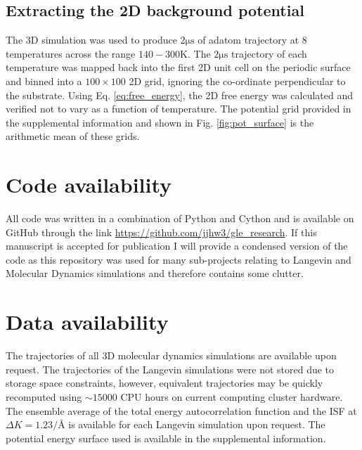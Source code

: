 \documentclass[7pt]{article}
\newcommand{\us}{\si{\micro\second}}
\newcommand{\K}{\si{\kelvin}}
\begin{document}
\subsection*{Extracting the 2D background potential}

The 3D simulation was used to produce $2\us$ of adatom trajectory at 8 temperatures across the range $140-300\K$. The $2\us$ trajectory of each temperature was mapped back into the first 2D unit cell on the periodic surface and binned into a $100\times100$ 2D grid, ignoring the co-ordinate perpendicular to the substrate. Using Eq. \ref{eq:free_energy}, the 2D free energy was calculated and verified not to vary as a function of temperature. The potential grid provided in the supplemental information and shown in Fig. \ref{fig:pot_surface} is the arithmetic mean of these grids.

\section*{Code availability}

All code was written in a combination of Python and Cython and is available on GitHub through the link \url{https://github.com/jjhw3/gle_research}. If this manuscript is accepted for publication I will provide a condensed version of the code as this repository was used for many sub-projects relating to Langevin and Molecular Dynamics simulations and therefore contains some clutter. 

\section*{Data availability}

The trajectories of all 3D molecular dynamics simulations are available upon request. The trajectories of the Langevin simulations were not stored due to storage space constraints, however, equivalent trajectories may be quickly recomputed using $\sim15000$ CPU hours on current computing cluster hardware. The ensemble average of the total energy autocorrelation function and the ISF at $\Delta{K}=1.23\si{\per\angstrom}$ is available for each Langevin simulation upon request. The potential energy surface used is available in the supplemental information.



\end{document}
